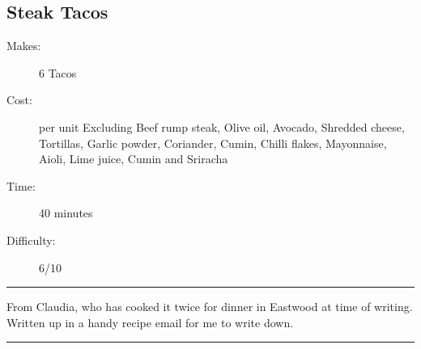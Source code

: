 \documentclass[]{article}
\begin{document}
\subsection*{\center\huge Steak Tacos}
\begin{description}
\item[Makes:] 6 Tacos
\item[Cost:]  per unit Excluding Beef rump steak, Olive oil, Avocado, Shredded cheese, Tortillas, Garlic powder, Coriander, Cumin, Chilli flakes, Mayonnaise, Aioli, Lime juice, Cumin and Sriracha
\item[Time:] 40 minutes
\item[Difficulty:] 6/10
\end{description}
\vspace{0.2cm}\hrule\vspace{0.5cm}
\begin{adjustwidth}{0.5 cm}{0.5 cm}

From Claudia, who has cooked it twice for dinner in Eastwood at time of writing. Written up in a handy recipe email for me to write down. \hfill{}\color{black}

\end{adjustwidth}
\vspace{0.5cm}\hrule
\end{document}
